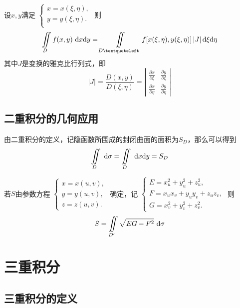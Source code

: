 \ttheorem[一般变换]
设$x,y$满足
$
\begin{cases}
x = x(\xi,\eta),\\
y = y(\xi,\eta). \\
\end{cases}
$
则
\begin{equation}
\iint\limits_{D}f(x,y)\,\, \d x \d y= \iint\limits_{D‘}f[x(\xi,\eta),y(\xi,\eta)]\,|J|\, \d \xi \d \eta
\end{equation}
其中$J$是变换的雅克比行列式，即
\renewcommand{\arraystretch}{1.5}
\begin{equation*}
|J|=\frac{D(x,y)}{D(\xi,\eta)}=
\left| 
\begin{array}{cc}
\displaystyle \frac{\partial x}{\partial \xi} & \displaystyle \frac{\partial y}{\partial \xi} \\
\displaystyle \frac{\partial x}{\partial \eta} & \displaystyle \frac{\partial y}{\partial \eta} 
\end{array}
\right| 
\end{equation*}
\renewcommand{\arraystretch}{1}

\subsection{二重积分的几何应用}
\sj
\example[求隐函数的平面面积]
由二重积分的定义，记隐函数所围成的封闭曲面的面积为$S_D$，那么可以得到
\begin{equation}
\iint\limits_{D} \, \, {\rm{d}} \sigma=\iint\limits_{D}\, \, {\rm{d}} x {\rm{d}} y=S_D
\end{equation}

\example[求空间曲面的面积]
若$S$由参数方程
$
\begin{cases}
x = x(u,v),\\
y = y(u,v),\\
z= z(u,v).
\end{cases}
$
确定，记
$
\begin{cases}
E = x_u^2 + y_u^2 +z_u^2,\\
F = x_ux_v + y_uy_v + z_uz_v,\\
G = x_v^2 + y_v^2 +z_v^2.
\end{cases}
$
则
\begin{equation}
S=\iint\limits_{D'} \sqrt{EG-F^2}\, \, {\rm{d}} \sigma
\end{equation}

\section{三重积分}
\subsection{三重积分的定义}

